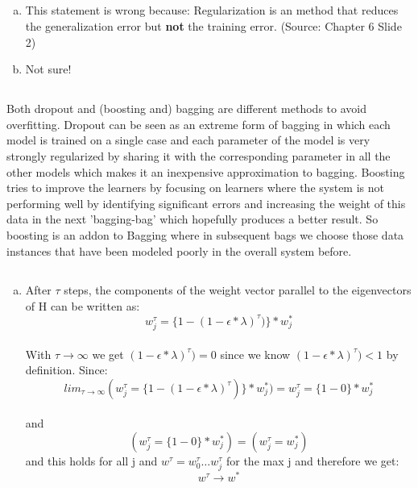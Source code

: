 \documentclass[12pt]{article}
\begin{document}

\setcounter{section}{6}
\setcounter{subsection}{1}

\subsection{ }

\begin{enumerate}[a)]
    \item   
        This statement is wrong because: Regularization is an method that reduces the generalization error but \textbf{not} the training error. (Source: Chapter 6 Slide 2)
    \item
        Not sure!
\end{enumerate}

\subsection{}
Both dropout and (boosting and) bagging are different methods to avoid overfitting.
Dropout can be seen as an extreme form of bagging in which each model is trained on a single case and each parameter of the model is very strongly regularized by sharing it with the corresponding parameter in all the other models which makes it an inexpensive approximation to bagging.
Boosting tries to improve the learners by focusing on learners where the system is not performing well by identifying significant errors and increasing the weight of this data in the next 'bagging-bag' which hopefully produces a better result. So boosting is an addon to Bagging where in subsequent bags we choose those data instances that have been modeled poorly in the overall system before.

\subsection{}
\begin{enumerate}[a)]
	\item 
		After $\tau$ steps, the components of the weight vector parallel to the eigenvectors of H can be written as:\\
			$$w^\tau_j= \{1-(1- \epsilon*\lambda)^\tau)\}*w^*_j $$ \\
		With $\tau \rightarrow \infty $ we get $(1- \epsilon*\lambda)^\tau)=0$ since we know $(1- \epsilon*\lambda)^\tau)<1$ by definition. Since:
		   $$lim_{\tau \rightarrow \infty} (w^\tau_j= \{1-(1- \epsilon*\lambda)^\tau)\}*w^*_j) = w^\tau_j= \{1-0\}*w^*_j$$\\
		   and \\
		   $$(w^\tau_j= \{1-0\}*w^*_j)= (w^\tau_j= w^*_j)$$
		   and this holds for all j and $w^\tau= w^\tau_0 \dots w^\tau_j$ for the max j and therefore we get:\\
		   $$ w^\tau \rightarrow w^* $$
		    
		
\end{enumerate}
\end{document}
